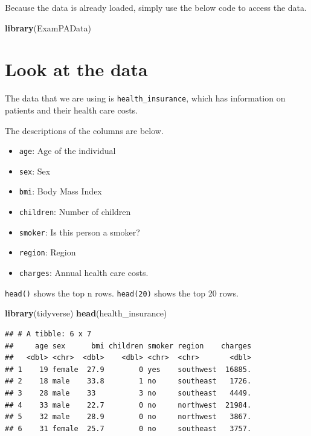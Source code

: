\documentclass[openany]{book}
\newenvironment{Shaded}{\begin{snugshade}}{\end{snugshade}}
\newcommand{\KeywordTok}[1]{\textcolor[rgb]{0.13,0.29,0.53}{\textbf{#1}}}
\newcommand{\NormalTok}[1]{#1}
\providecommand{\tightlist}{%
  \setlength{\itemsep}{0pt}\setlength{\parskip}{0pt}}
\begin{document}
Because the data is already loaded, simply use the below code to access the data.

\begin{Shaded}
\begin{Highlighting}[]
\KeywordTok{library}\NormalTok{(ExamPAData)}
\end{Highlighting}
\end{Shaded}

\hypertarget{look-at-the-data}{%
\section{Look at the data}\label{look-at-the-data}}

The data that we are using is \texttt{health\_insurance}, which has information on patients and their health care costs.

The descriptions of the columns are below.

\begin{itemize}
\tightlist
\item
  \texttt{age}: Age of the individual
\item
  \texttt{sex}: Sex
\item
  \texttt{bmi}: Body Mass Index
\item
  \texttt{children}: Number of children
\item
  \texttt{smoker}: Is this person a smoker?
\item
  \texttt{region}: Region
\item
  \texttt{charges}: Annual health care costs.
\end{itemize}

\texttt{head()} shows the top n rows. \texttt{head(20)} shows the top 20 rows.

\begin{Shaded}
\begin{Highlighting}[]
\KeywordTok{library}\NormalTok{(tidyverse)}
\KeywordTok{head}\NormalTok{(health_insurance)}
\end{Highlighting}
\end{Shaded}

\begin{verbatim}
## # A tibble: 6 x 7
##     age sex      bmi children smoker region    charges
##   <dbl> <chr>  <dbl>    <dbl> <chr>  <chr>       <dbl>
## 1    19 female  27.9        0 yes    southwest  16885.
## 2    18 male    33.8        1 no     southeast   1726.
## 3    28 male    33          3 no     southeast   4449.
## 4    33 male    22.7        0 no     northwest  21984.
## 5    32 male    28.9        0 no     northwest   3867.
## 6    31 female  25.7        0 no     southeast   3757.
\end{verbatim}
\end{document}
